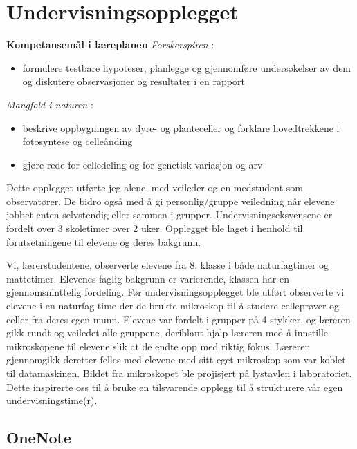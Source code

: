 \documentclass[main.tex]{subfiles}
\begin{document}
\section{Undervisningsopplegget}
\label{sec:1}

\textbf{Kompetansemål i læreplanen}
\newline
\emph{Forskerspiren} :
\begin{itemize}
\item formulere testbare hypoteser, planlegge og gjennomføre undersøkelser 
av dem og diskutere observasjoner og resultater i en rapport
\end{itemize}
\emph{Mangfold i naturen} :
\begin{itemize}
\item beskrive oppbygningen av dyre- og planteceller og forklare hovedtrekkene i fotosyntese og celleånding
\item gjøre rede for celledeling og for genetisk variasjon og arv
\end{itemize}
Dette opplegget utførte jeg alene, med veileder og en medstudent som observatører. 
De bidro også med å gi personlig/gruppe veiledning når elevene jobbet enten selvstendig eller sammen i grupper. 
Undervisningseksvensene er fordelt over 3 skoletimer over 2 uker. Opplegget ble laget i henhold til 
forutsetningene til elevene og deres bakgrunn. 

Vi, lærerstudentene, observerte elevene fra 8. klasse i både naturfagtimer og mattetimer. Elevenes faglig bakgrunn er varierende, 
klassen har en gjennomsninttelig fordeling. 
Før undervisningsopplegget ble utført observerte vi elevene i en naturfag time der de brukte mikroskop til å studere celleprøver 
og celler fra deres egen munn. Elevene var fordelt i grupper på 4 stykker, og læreren gikk rundt og veiledet alle gruppene, 
deriblant hjalp læreren med å innstille mikroskopene til elevene slik at de endte opp med riktig fokus. Læreren gjennomgikk deretter 
felles med elevene med sitt eget mikroskop som var koblet til datamaskinen. Bildet fra mikroskopet ble projisjert på lystavlen 
i laboratoriet. Dette inspirerte oss til å bruke en tilsvarende opplegg til å strukturere vår egen undervisningstime(r).

\subsection{OneNote}
\end{document}

